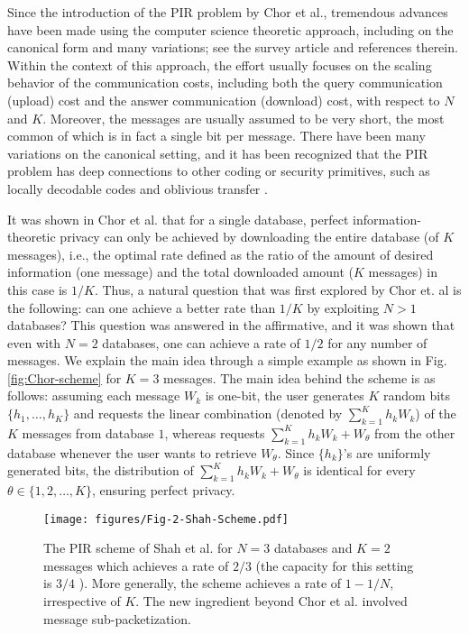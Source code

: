 Since the introduction of the PIR problem by Chor et al., tremendous advances have been made using the computer science theoretic approach, including on the canonical form and many variations; see the survey article \cite{William} and references therein. Within the context of this approach, the effort usually focuses on the scaling behavior of the communication costs, including both the query communication (upload) cost and the answer communication (download) cost, with respect to $N$ and $K$. Moreover, the messages are usually assumed to be very short, the most common of which is in fact a single bit per message. There have been many variations on the canonical setting, and it has been recognized that the PIR problem has deep connections to other coding or security primitives, such as locally decodable codes and oblivious transfer \cite{goldreich2002lower,YekhaninPhd,di2000single}. 

It was shown in Chor et al. that for a single database,  perfect information-theoretic privacy can only be achieved by downloading the entire database (of $K$ messages), i.e., the optimal rate defined as the ratio of the amount of desired information (one message)  and the total downloaded amount ($K$ messages) in this case is $1/K$. Thus, a natural question that was first explored by Chor et. al is the following: can one achieve a better rate than $1/K$ by exploiting $N>1$ databases? This question was answered in the affirmative, and it was shown that even with $N=2$ databases, one can achieve a rate of $1/2$ for any number of messages. We explain the main idea through a simple example as shown in Fig. \ref{fig:Chor-scheme} for $K=3$ messages. The main idea behind the scheme is as follows: assuming each message $W_k$ is one-bit, the user generates $K$ random bits $\{h_1, \ldots, h_K\}$
and  requests the linear combination (denoted by $\sum_{k=1}^{K}h_k W_k$) of the $K$ messages from database $1$, whereas requests $\sum_{k=1}^{K}h_k W_k + W_{\theta}$ from the other database whenever the user wants  to retrieve $W_\theta$. Since $\{h_k\}$'s are uniformly generated bits, the distribution of $\sum_{k=1}^{K}h_k W_k + W_{\theta}$ is identical for every $\theta \in \{1, 2,\ldots, K\}$, ensuring perfect privacy. 

\begin{figure}[t]
\centering
\vspace{0.2cm}
\texttt{[image: figures/Fig-2-Shah-Scheme.pdf]}
\caption{The PIR scheme of Shah et al. \cite{Shah_Rashmi_Kannan} for $N=3$ databases and $K=2$ messages which achieves a rate of $2/3$ (the capacity for this setting is $3/4$ \cite{sun2017PIRcapacity}). More generally, the scheme achieves a rate of $1-1/N$, irrespective of $K$. The new ingredient beyond Chor et al. \cite{PIRfirst} involved message sub-packetization.  \label{fig:Shah-scheme} }
\end{figure}

